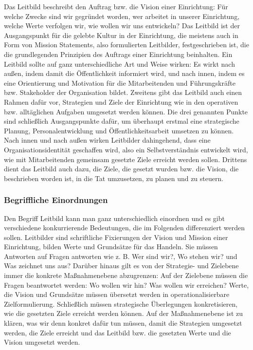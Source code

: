 \documentclass[
  letterpaper,
]{book}
\begin{document}
Das Leitbild beschreibt den Auftrag bzw. die Vision einer Einrichtung:
Für welche Zwecke sind wir gegründet worden, wer arbeitet in unserer
Einrichtung, welche Werte verfolgen wir, wie wollen wir uns entwickeln?
Das Leitbild ist der Ausgangspunkt für die gelebte Kultur in der
Einrichtung, die meistens auch in Form von Mission Statements, also
formulierten Leitbilder, festgeschrieben ist, die die grundlegenden
Prinzipien des Auftrags einer Einrichtung beinhalten. Ein Leitbild
sollte auf ganz unterschiedliche Art und Weise wirken: Es wirkt nach
außen, indem damit die Öffentlichkeit informiert wird, und nach innen,
indem es eine Orientierung und Motivation für die Mitarbeitenden und
Führungskräfte bzw. Stakeholder der Organisation bildet. Zweitens gibt
das Leitbild auch einen Rahmen dafür vor, Strategien und Ziele der
Einrichtung wie in den operativen bzw. alltäglichen Aufgaben umgesetzt
werden können. Die drei genannten Punkte sind schließlich Ausgangspunkte
dafür, um überhaupt erstmal eine strategische Planung,
Personalentwicklung und Öffentlichkeitsarbeit umsetzen zu können. Nach
innen und nach außen wirken Leitbilder dahingehend, dass eine
Organisationsidentität geschaffen wird, also ein Selbstverständnis
entwickelt wird, wie mit Mitarbeitenden gemeinsam gesetzte Ziele
erreicht werden sollen. Drittens dient das Leitbild auch dazu, die
Ziele, die gesetzt wurden bzw. die Vision, die beschrieben worden ist,
in die Tat umzusetzen, zu planen und zu steuern.

\subsubsection{Begriffliche
Einordnungen}\label{begriffliche-einordnungen}

Den Begriff Leitbild kann man ganz unterschiedlich einordnen und es gibt
verschiedene konkurrierende Bedeutungen, die im Folgenden differenziert
werden sollen. Leitbilder sind schriftliche Fixierungen der Vision und
Mission einer Einrichtung, bilden Werte und Grundsätze für das Handeln.
Sie müssen Antworten auf Fragen antworten wie z. B. Wer sind wir?, Wo
stehen wir? und Was zeichnet uns aus? Darüber hinaus gilt es von der
Strategie- und Zielebene immer die konkrete Maßnahmenebene abzugrenzen:
Auf der Zielebene müssen die Fragen beantwortet werden: Wo wollen wir
hin? Was wollen wir erreichen? Werte, die Vision und Grundsätze müssen
übersetzt werden in operationalisierbare Zielformulierung. Schließlich
müssen strategische Überlegungen konkretisieren, wie die gesetzten Ziele
erreicht werden können. Auf der Maßnahmenebene ist zu klären, was wir
denn konkret dafür tun müssen, damit die Strategien umgesetzt werden,
die Ziele erreicht und das Leitbild bzw. die gesetzten Werte und die
Vision umgesetzt werden.
\end{document}
